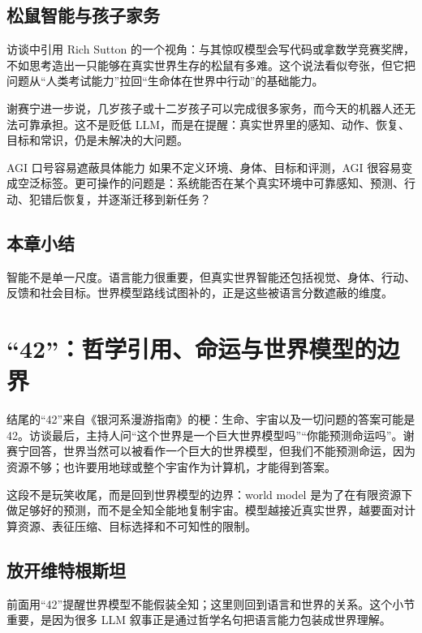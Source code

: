 \documentclass[a4paper]{article}
\begin{document}
\subsection{松鼠智能与孩子家务}

访谈中引用 Rich Sutton 的一个视角：与其惊叹模型会写代码或拿数学竞赛奖牌，不如思考造出一只能够在真实世界生存的松鼠有多难。这个说法看似夸张，但它把问题从“人类考试能力”拉回“生命体在世界中行动”的基础能力。

谢赛宁进一步说，几岁孩子或十二岁孩子可以完成很多家务，而今天的机器人还无法可靠承担。这不是贬低 LLM，而是在提醒：真实世界里的感知、动作、恢复、目标和常识，仍是未解决的大问题。

\begin{warningbox}{AGI 口号容易遮蔽具体能力}
如果不定义环境、身体、目标和评测，AGI 很容易变成空泛标签。更可操作的问题是：系统能否在某个真实环境中可靠感知、预测、行动、犯错后恢复，并逐渐迁移到新任务？
\end{warningbox}

\subsection{本章小结}

智能不是单一尺度。语言能力很重要，但真实世界智能还包括视觉、身体、行动、反馈和社会目标。世界模型路线试图补的，正是这些被语言分数遮蔽的维度。

\section{“42”：哲学引用、命运与世界模型的边界}

结尾的“42”来自《银河系漫游指南》的梗：生命、宇宙以及一切问题的答案可能是 42。访谈最后，主持人问“这个世界是一个巨大世界模型吗”“你能预测命运吗”。谢赛宁回答，世界当然可以被看作一个巨大的世界模型，但我们不能预测命运，因为资源不够；也许要用地球或整个宇宙作为计算机，才能得到答案。

这段不是玩笑收尾，而是回到世界模型的边界：world model 是为了在有限资源下做足够好的预测，而不是全知全能地复制宇宙。模型越接近真实世界，越要面对计算资源、表征压缩、目标选择和不可知性的限制。

\subsection{放开维特根斯坦}

前面用“42”提醒世界模型不能假装全知；这里则回到语言和世界的关系。这个小节重要，是因为很多 LLM 叙事正是通过哲学名句把语言能力包装成世界理解。
\end{document}
